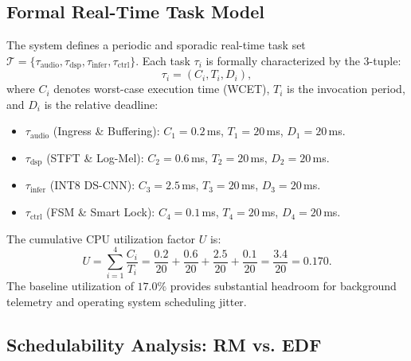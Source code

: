 \documentclass[10pt,twocolumn,letterpaper]{article}
\begin{document}
\subsection{Formal Real-Time Task Model}

The system defines a periodic and sporadic real-time task set $\mathcal{T} = \{\tau_{\text{audio}}, \tau_{\text{dsp}}, \tau_{\text{infer}}, \tau_{\text{ctrl}}\}$. Each task $\tau_i$ is formally characterized by the 3-tuple:
\begin{equation}
    \tau_i = (C_i, T_i, D_i),
\end{equation}
where $C_i$ denotes worst-case execution time (WCET), $T_i$ is the invocation period, and $D_i$ is the relative deadline:
\begin{itemize}
    \item $\tau_{\text{audio}}$ (Ingress \& Buffering): $C_1 = 0.2$\,ms, $T_1 = 20$\,ms, $D_1 = 20$\,ms.
    \item $\tau_{\text{dsp}}$ (STFT \& Log-Mel): $C_2 = 0.6$\,ms, $T_2 = 20$\,ms, $D_2 = 20$\,ms.
    \item $\tau_{\text{infer}}$ (INT8 DS-CNN): $C_3 = 2.5$\,ms, $T_3 = 20$\,ms, $D_3 = 20$\,ms.
    \item $\tau_{\text{ctrl}}$ (FSM \& Smart Lock): $C_4 = 0.1$\,ms, $T_4 = 20$\,ms, $D_4 = 20$\,ms.
\end{itemize}

The cumulative CPU utilization factor $U$ is:
\begin{equation}
    U = \sum_{i=1}^{4} \frac{C_i}{T_i} = \frac{0.2}{20} + \frac{0.6}{20} + \frac{2.5}{20} + \frac{0.1}{20} = \frac{3.4}{20} = 0.170.
\end{equation}
The baseline utilization of $17.0\%$ provides substantial headroom for background telemetry and operating system scheduling jitter.

\subsection{Schedulability Analysis: RM vs. EDF}
\end{document}
